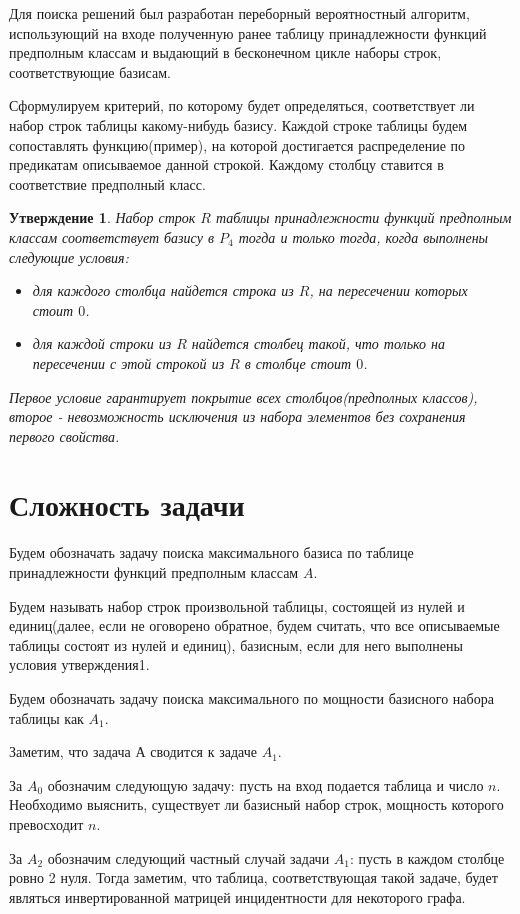 \documentclass[a4paper,14pt]{extreport}
\newtheorem{utv}{Утверждение}
\begin{document}
Для поиска решений был разработан переборный вероятностный алгоритм, использующий на входе полученную ранее таблицу принадлежности функций предполным классам и выдающий в бесконечном цикле наборы строк, соответствующие базисам. 

Сформулируем критерий, по которому будет определяться, соответствует ли набор строк таблицы какому-нибудь базису.
Каждой строке таблицы будем сопоставлять функцию(пример), на которой достигается распределение по предикатам описываемое данной строкой. Каждому столбцу ставится в соответствие предполный класс.  
\begin{utv}
Набор строк $R$ таблицы принадлежности функций предполным классам соответствует базису в $P_4$ тогда и только тогда, когда выполнены следующие условия:
\begin{itemize}
\item для каждого столбца найдется строка из $R$, на пересечении которых стоит $0$.    
\item для каждой строки из $R$ найдется столбец такой, что только на пересечении с этой строкой из $R$ в столбце стоит $0$.   
\end{itemize}
Первое условие гарантирует покрытие всех столбцов(предполных классов), второе - невозможность исключения из набора элементов без сохранения первого свойства. 
\end{utv}

\section{Сложность задачи}
Будем обозначать задачу поиска максимального базиса по таблице принадлежности функций предполным классам $A$.

Будем называть набор строк произвольной таблицы, состоящей из нулей и единиц(далее, если не оговорено обратное, будем считать, что все описываемые таблицы состоят из нулей и единиц), базисным, если для него выполнены условия утверждения1.

Будем обозначать задачу поиска максимального по мощности базисного набора таблицы как $A_1$.

Заметим, что задача А сводится к задаче $A_1$.

За $A_0$ обозначим следующую задачу: пусть на вход подается таблица и число $n$. Необходимо выяснить, существует ли базисный набор строк, мощность которого превосходит $n$.

За $A_2$ обозначим следующий частный случай задачи $A_1$: пусть в каждом столбце ровно 2 нуля. Тогда заметим, что таблица, соответствующая такой задаче, будет являться инвертированной матрицей инцидентности для некоторого графа.
\end{document}
